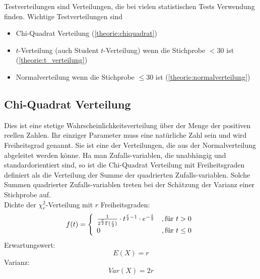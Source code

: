 \begin{tcolorbox}[colback=green!5,colframe=green!40!black,title=Testverteilungen]
Testverteilungen sind Verteilungen, die bei vielen statistischen Tests Verwendung finden. Wichtige Testverteilungen sind
\begin{itemize}
\item Chi-Quadrat Verteilung (\autoref{theorie:chiquadrat})
\item $t$-Verteilung (auch Student $t$-Verteilung) wenn die Stichprobe $<30$ ist (\autoref{theorie:t_verteilung})
\item Normalverteilung wenn die Stichprobe $\leq 30$ ist (\autoref{theorie:normalverteilung})
\end{itemize}
\end{tcolorbox}
\pagebreak[2]
\subsection{Chi-Quadrat Verteilung}\label{theorie:chiquadrat}
Dies ist eine stetige Wahrscheinlichkeitsverteilung über der Menge der positiven reellen Zahlen. Ihr einziger Parameter muss eine natürliche Zahl sein und wird Freiheitsgrad genannt. Sie ist eine der Verteilungen, die aus der Normalverteilung abgeleitet werden könne. Ha man Zufalls-variablen, die unabhängig und standardorientiert sind, so ist die Chi-Quadrat Verteilung mit Freiheitsgraden definiert als die Verteilung der Summe der quadrierten Zufalls-variablen. Solche Summen quadrierter Zufalls-variablen treten bei der Schätzung der Varianz einer Stichprobe auf.\\
Dichte der $\chi_r^2$-Verteilung mit $r$ Freiheitsgraden:
\begin{equation}\label{eq:chisqare:1}
f(t)=\left\{\begin{array}{l l} \frac{1}{2^{\frac{r}{2}}\Gamma(\frac{r}{2})}\cdot t^{\frac{r}{2}-1}\cdot e^{-\frac{t}{2}}&, \mbox{für }t > 0 \\ 0 &, \mbox{für } t \leq 0\end{array}\right.
\end{equation}
Erwartungswert:
\begin{equation}
E(X) = r
\end{equation}
Varianz:
\begin{equation}
Var(X) = 2r
\end{equation}
